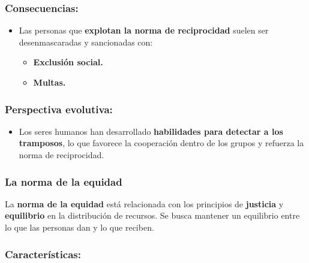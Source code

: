 \documentclass[
]{book}
\providecommand{\tightlist}{%
  \setlength{\itemsep}{0pt}\setlength{\parskip}{0pt}}
\begin{document}
\subsubsection{Consecuencias:}\label{consecuencias}

\begin{itemize}
\tightlist
\item
  Las personas que \textbf{explotan la norma de reciprocidad} suelen ser desenmascaradas y sancionadas con:

  \begin{itemize}
  \tightlist
  \item
    \textbf{Exclusión social.}
  \item
    \textbf{Multas.}
  \end{itemize}
\end{itemize}

\subsubsection{Perspectiva evolutiva:}\label{perspectiva-evolutiva}

\begin{itemize}
\tightlist
\item
  Los seres humanos han desarrollado \textbf{habilidades para detectar a los tramposos}, lo que favorece la cooperación dentro de los grupos y refuerza la norma de reciprocidad.
\end{itemize}

\subsubsection{La norma de la equidad}\label{la-norma-de-la-equidad}

La \textbf{norma de la equidad} está relacionada con los principios de \textbf{justicia} y \textbf{equilibrio} en la distribución de recursos. Se busca mantener un equilibrio entre lo que las personas dan y lo que reciben.

\subsubsection{Características:}\label{caracteruxedsticas}
\end{document}
